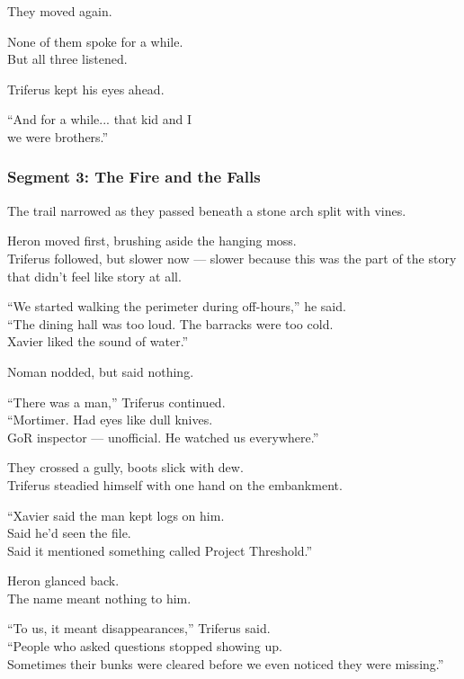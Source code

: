 \documentclass[9pt]{article}
\begin{document}
They moved again.

None of them spoke for a while.\\
But all three listened.

Triferus kept his eyes ahead.

“And for a while... that kid and I\\
we were brothers.”

\newpage

\subsubsection*{Segment 3: The Fire and the Falls}

The trail narrowed as they passed beneath a stone arch split with vines.

Heron moved first, brushing aside the hanging moss.\\
Triferus followed, but slower now — slower because this was the part of the story that didn’t feel like story at all.

\vspace{1em}

“We started walking the perimeter during off-hours,” he said.\\
“The dining hall was too loud. The barracks were too cold.\\
Xavier liked the sound of water.”

Noman nodded, but said nothing.

\vspace{1em}

“There was a man,” Triferus continued.\\
“Mortimer. Had eyes like dull knives.\\
GoR inspector — unofficial. He watched us everywhere.”

They crossed a gully, boots slick with dew.\\
Triferus steadied himself with one hand on the embankment.

“Xavier said the man kept logs on him.\\
Said he’d seen the file.\\
Said it mentioned something called Project Threshold.”

Heron glanced back.\\
The name meant nothing to him.

“To us, it meant disappearances,” Triferus said.\\
“People who asked questions stopped showing up.\\
Sometimes their bunks were cleared before we even noticed they were missing.”
\end{document}
